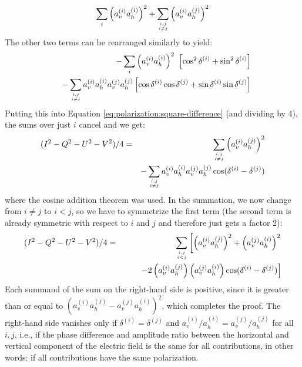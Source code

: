 \begin{equation}
  \sum_i \left(a_v^{(i)}a_h^{(i)}\right)^2
  + \sum_{{i,j}\atop{i\not=j}} \left(a_v^{(i)}a_h^{(j)}\right)^2
\end{equation}
The other two terms can be rearranged similarly to yield:
\begin{eqnarray}
 &&- \sum_i \left( a_v^{(i)} a_h^{(i)} \right)^2 \
           \left[\cos^2\delta^{(i)} + \sin^2\delta^{(i)} \right]\\ \nonumber
 &&- \sum_{{i,j}\atop{i\not=j}} a_v^{(i)} a_h^{(i)} a_v^{(j)} a_h^{(j)} 
    \left[\cos\delta^{(i)}\cos\delta^{(j)}  
          + \sin\delta^{(i)}\sin\delta^{(j)} \right] 
\end{eqnarray}
Putting this into Equation \ref{eq:polarization:square-difference} (and
dividing by 4), the sums over just $i$ cancel and we get:
\begin{eqnarray}
\label{eq:polarization:square-difference2}  
(I^2 - Q^2 - U^2 - V^2)/4 &=&
  \sum_{{i,j}\atop{i\not=j}} \left(a_v^{(i)}a_h^{(j)}\right)^2\\ \nonumber
 &&- \sum_{{i,j}\atop{i\not=j}} a_v^{(i)} a_h^{(i)} a_v^{(j)} a_h^{(j)} 
    \cos(\delta^{(i)}-\delta^{(j)}) 
\end{eqnarray}
where the cosine addition theorem was used.  In the summation, we now
change from $i \not= j$ to $i<j$, so we have to symmetrize the first
term (the second term is already symmetric with respect to $i$ and $j$ and
therefore just gets a factor 2):
\begin{eqnarray}
\label{eq:polarization:square-difference3}  
(I^2 - Q^2 - U^2 - V^2)/4 &=&
  \sum_{{i,j}\atop{i<j}}\left[ 
   \left(a_v^{(i)}a_h^{(j)}\right)^2
   +\left(a_v^{(j)}a_h^{(i)}\right)^2 \right. \\ \nonumber
 &&\qquad\left.
 - 2 \left(a_v^{(i)} a_h^{(j)} \right) \left(a_v^{(j)} a_h^{(i)}\right) 
    \cos(\delta^{(i)}-\delta^{(j)}) \right]
\end{eqnarray}
Each summand of the sum on the right-hand side is positive, since it
is greater than or equal to $(a_v^{(i)}a_h^{(j)} -
a_v^{(j)}a_h^{(i)})^2$, which completes the proof.
The right-hand side vanishes only if $\delta^{(i)}=\delta^{(j)}$ and
$a_v^{(i)}/a_h^{(i)} = a_v^{(j)}/a_h^{(j)}$ for all $i,j$, i.e., if
the phase difference and amplitude ratio between the horizontal and
vertical component of the electric field is the same for all
contributions, in other words: if all contributions have the same
polarization.

